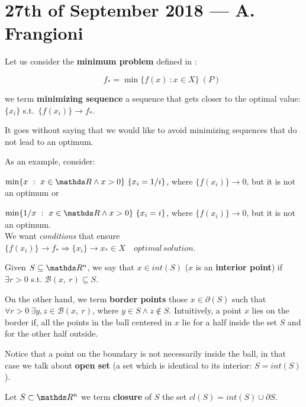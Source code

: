 \documentclass[ComputationalMathematics.tex]{subfiles}
\begin{document}
\section{27th of September 2018 --- A. Frangioni}


\begin{definition}
Let us consider the \textbf{minimum problem} defined in :

\[
  \qquad f_* = \min \{f(x)~:x \in X\}~(P)
\]

  we term \textbf{minimizing sequence} a sequence that gets closer to the optimal value: $\{x_i\}$ s.t.~$\{f(x_i)\} \to f_*$.
\end{definition}

It goes without saying that we would like to avoid minimizing sequences that do not lead to an optimum.

As an example, consider:

  $\min \{x~:~x \in \R \wedge x > 0\} ~ \{x_i = 1/i\}$, where $\{f(x_i)\} \to 0$, but it is not an optimum or 

  $\min \{1/x~:~x \in \R \wedge x > 0\} ~ \{x_i = i\}$, where $\{f(x_i)\} \to 0$, but it is not an optimum.\\
  
We want \emph{conditions} that ensure $\{f(x_i)\} \to f_* \Rightarrow \{x_i\}\to x_* \in X \quad optimal \, solution$.

\begin{definition}
  Given $S \subseteq \R^n$, we say that $x \in int(S)$ ($x$ is an \textbf{interior point}) if $\exists r > 0$ s.t. $\mathcal{B}(x,~r) \subseteq S$.

  On the other hand, we term \textbf{border points} those $x \in \partial(S)$ such that $\forall r > 0~\exists y,z \in \mathcal{B}(x,~r)$, where $y \in S \wedge z \notin S$.
  Intuitively, a point $x$ lies on the border if, all the points in the ball centered in $x$ lie for a half inside the set $S$ and for the other half outside. 
\end{definition}

Notice that a point on the boundary is not necessarily inside the ball, in that case we talk about \textbf{open set} (a set which is identical to its interior: $S = int(S)$).

\begin{definition}
  Let $S \subset \R^n$ we term \textbf{closure} of $S$ the set $cl(S) = int(S) \cup \partial S$.
\end{definition}
\end{document}
